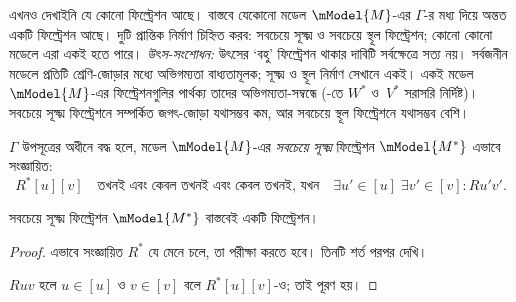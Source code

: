 \documentclass[../../../include/open-logic-section]{subfiles}
\begin{document}


এখনও দেখাইনি যে কোনো ফিল্ট্রেশন আছে। বাস্তবে যেকোনো মডেল $\mModel{M}$-এর $\Gamma$-র মধ্য দিয়ে অন্তত একটি ফিল্ট্রেশন আছে। দুটি প্রান্তিক নির্মাণ চিহ্নিত করব: সবচেয়ে সূক্ষ্ম ও সবচেয়ে স্থূল ফিল্ট্রেশন; কোনো কোনো মডেলে এরা একই হতে পারে।
\emph{উৎস-সংশোধন:} উৎসের ‘বহু’ ফিল্ট্রেশন থাকার দাবিটি সর্বক্ষেত্রে সত্য নয়। সর্বজনীন মডেলে প্রতিটি শ্রেণি-জোড়ার মধ্যে অভিগম্যতা বাধ্যতামূলক; সূক্ষ্ম ও স্থূল নির্মাণ সেখানে একই।
 একই মডেল $\mModel{M}$-এর ফিল্ট্রেশনগুলির পার্থক্য তাদের অভিগম্যতা-সম্বন্ধে (-তে $W^*$ ও~$V^*$ সরাসরি নির্দিষ্ট)। সবচেয়ে সূক্ষ্ম ফিল্ট্রেশনে সম্পর্কিত জগৎ-জোড়া যথাসম্ভব কম, আর সবচেয়ে স্থূল ফিল্ট্রেশনে যথাসম্ভব বেশি।

\begin{defn}
  $\Gamma$ উপসূত্রের অধীনে বদ্ধ হলে, মডেল $\mModel{M}$-এর \emph{সবচেয়ে সূক্ষ্ম} ফিল্ট্রেশন $\mModel{M^*}$ এভাবে সংজ্ঞায়িত:
  \[
  R^*[u][v] \quad \text{তখনই এবং কেবল তখনই এবং কেবল তখনই, যখন} \quad \exists u'\in [u] \;
  \exists v' \in [v] : Ru'v'.
  \]
\end{defn}

\begin{prop}
  সবচেয়ে সূক্ষ্ম ফিল্ট্রেশন $\mModel{M^*}$ বাস্তবেই একটি ফিল্ট্রেশন।
\end{prop}

\begin{proof}
  এভাবে সংজ্ঞায়িত $R^*$ যে  মেনে চলে, তা পরীক্ষা করতে হবে। তিনটি শর্ত পরপর দেখি।

  $Ruv$ হলে $u \in [u]$ ও $v \in [v]$ বলে $R^*[u][v]$-ও; তাই  পূরণ হয়।


\end{proof}
\end{document}
